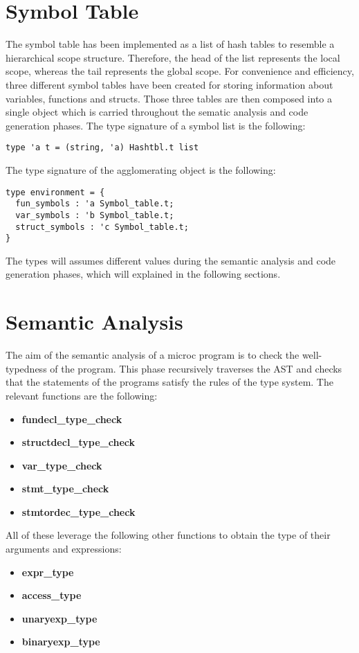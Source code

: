 \documentclass{article}
\begin{document}
\section{Symbol Table}
The symbol table has been implemented as a list of hash tables to resemble a hierarchical scope structure.
Therefore, the head of the list represents the local scope, whereas the tail represents the global scope.
For convenience and efficiency, three different symbol tables have been created for storing information about variables, functions and structs.
Those three tables are then composed into a single object which is carried throughout the sematic analysis and code generation phases.
The type signature of a symbol list is the following:
\begin{lstlisting}[linewidth=10cm, frame=single, basicstyle=\ttfamily\fontsize{8pt}{14pt}]
type 'a t = (string, 'a) Hashtbl.t list
\end{lstlisting}
The type signature of the agglomerating object is the following:
\begin{lstlisting}[linewidth=10cm, frame=single, basicstyle=\ttfamily\fontsize{8pt}{14pt}]
type environment = {
  fun_symbols : 'a Symbol_table.t;
  var_symbols : 'b Symbol_table.t;
  struct_symbols : 'c Symbol_table.t;
}
\end{lstlisting}
The types will assumes different values during the semantic analysis and code generation phases, which will explained in the following sections.
\section{Semantic Analysis}
The aim of the semantic analysis of a microc program is to check the well-typedness of the program.
This phase recursively traverses the AST and checks that the statements of the programs satisfy the rules of the type system.
The relevant functions are the following:

\begin{itemize}
  \item \textbf{fundecl\_type\_check}
  \item \textbf{structdecl\_type\_check}
  \item \textbf{var\_type\_check}
  \item \textbf{stmt\_type\_check}
  \item \textbf{stmtordec\_type\_check}
\end{itemize}
All of these leverage the following other functions to obtain the type of their arguments and expressions:
\begin{itemize}
  \item \textbf{expr\_type}
  \item \textbf{access\_type}
  \item \textbf{unaryexp\_type}
  \item \textbf{binaryexp\_type}
\end{itemize}
\end{document}
